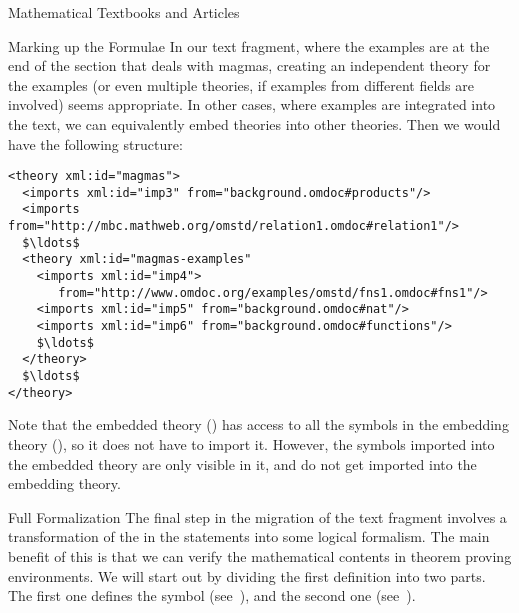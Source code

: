 \begin{omgroup}[short=Textbooks and Articles,id=algebra]{Mathematical Textbooks and Articles}
\begin{omgroup}[id=algebra.formulae]{Marking up the Formulae}
In our text fragment, where the examples are at the end of the section that deals
with magmas, creating an independent theory for the examples (or even multiple
theories, if examples from different fields are involved) seems appropriate. In
other cases, where examples are integrated into the text, we can equivalently embed
theories into other theories. Then we would have the following structure:

\begin{lstlisting}[label=lst:example-embedded,mathescape,
    caption={Examples embedded into a theory},
    index={theory,imports}]
<theory xml:id="magmas">
  <imports xml:id="imp3" from="background.omdoc#products"/>
  <imports from="http://mbc.mathweb.org/omstd/relation1.omdoc#relation1"/>
  $\ldots$
  <theory xml:id="magmas-examples"
    <imports xml:id="imp4"> 
       from="http://www.omdoc.org/examples/omstd/fns1.omdoc#fns1"/>
    <imports xml:id="imp5" from="background.omdoc#nat"/>
    <imports xml:id="imp6" from="background.omdoc#functions"/>
    $\ldots$
  </theory>
  $\ldots$
</theory>
\end{lstlisting}
Note that the embedded theory ({}) has access to all the
symbols in the embedding theory ({}), so it does not have to import it.
However, the symbols imported into the embedded theory are only visible in it, and do
not get imported into the embedding theory.
\end{omgroup}

\begin{omgroup}[id=algebra.formalization]{Full Formalization}
  The final step in the migration of the text fragment involves a transformation of the
  {} in the statements into some logical formalism. The
  main benefit of this is that we can verify the mathematical contents in theorem proving
  environments.  We will start out by dividing the first definition into two parts. The
  first one defines the symbol {}
  (see~), and the second one {}
  (see~).


\end{omgroup}
\end{omgroup}
